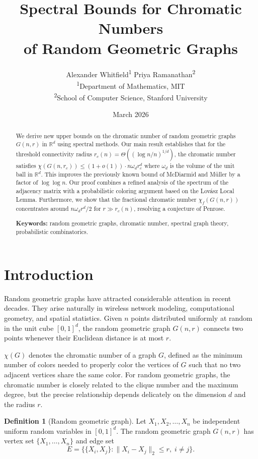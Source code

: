\documentclass[11pt]{article}
\title{Spectral Bounds for Chromatic Numbers\\of Random Geometric Graphs}
\author{Alexander Whitfield\textsuperscript{1}\quad
  Priya Ramanathan\textsuperscript{2}\\[6pt]
  \textsuperscript{1}Department of Mathematics, MIT\\
  \textsuperscript{2}School of Computer Science, Stanford University}
\date{March 2026}
\theoremstyle{definition}
\newtheorem{definition}{Definition}[section]
\begin{document}
\maketitle

\begin{abstract}
We derive new upper bounds on the chromatic number of random geometric
graphs $G(n, r)$ in $\mathbb{R}^d$ using spectral methods. Our main result
establishes that for the threshold connectivity radius $r_c(n) =
\Theta((\log n / n)^{1/d})$, the chromatic number satisfies
$\chi(G(n, r_c)) \leq (1 + o(1)) \cdot n \omega_d r_c^d$ where $\omega_d$
is the volume of the unit ball in $\mathbb{R}^d$. This improves the
previously known bound of McDiarmid and M\"uller by a factor of
$\log\log n$. Our proof combines a refined analysis of the spectrum of the
adjacency matrix with a probabilistic coloring argument based on the
Lov\'asz Local Lemma.
Furthermore, we show that the fractional chromatic number
$\chi_f(G(n, r))$ concentrates around $n \omega_d r^d / 2$ for
$r \gg r_c(n)$, resolving a conjecture of Penrose.

\medskip
\noindent\textbf{Keywords:} random geometric graphs, chromatic number,
spectral graph theory, probabilistic combinatorics.
\end{abstract}


\section{Introduction}

Random geometric graphs have attracted considerable attention in recent
decades.  They arise naturally in wireless network modeling, computational
geometry, and spatial statistics. Given $n$ points distributed uniformly
at random in the unit cube $[0,1]^d$, the random geometric graph $G(n,r)$
connects two points whenever their Euclidean distance is at most $r$.

$\chi(G)$ denotes the chromatic number of a graph $G$, defined as the
minimum number of colors needed to properly color the vertices of $G$ such
that no two adjacent vertices share the same color. For random geometric
graphs, the chromatic number is closely related to the clique number and
the maximum degree, but the precise relationship depends delicately on the
dimension $d$ and the radius $r$.

\begin{definition}[Random geometric graph]
Let $X_1, X_2, \ldots, X_n$ be independent uniform random variables in
$[0,1]^d$. The random geometric graph $G(n, r)$ has vertex set
$\{X_1, \ldots, X_n\}$ and edge set
\begin{equation}\label{eq:rgg-def}
  E = \bigl\{ \{X_i, X_j\} : \|X_i - X_j\|_2 \leq r,\; i \neq j \bigr\}.
\end{equation}
\end{definition}
\end{document}
